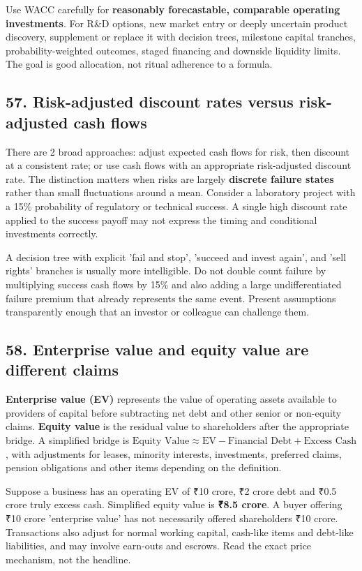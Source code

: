Use WACC carefully for \textbf{reasonably forecastable, comparable operating investments}. For R\&D options, new market entry or deeply uncertain product discovery, supplement or replace it with decision trees, milestone capital tranches, probability-weighted outcomes, staged financing and downside liquidity limits. The goal is good allocation, not ritual adherence to a formula.

\subsection{57. Risk-adjusted discount rates versus risk-adjusted cash flows}


There are 2 broad approaches: adjust expected cash flows for risk, then discount at a consistent rate; or use cash flows with an appropriate risk-adjusted discount rate. The distinction matters when risks are largely \textbf{discrete failure states} rather than small fluctuations around a mean. Consider a laboratory project with a 15\% probability of regulatory or technical success. A single high discount rate applied to the success payoff may not express the timing and conditional investments correctly.

A decision tree with explicit 'fail and stop', 'succeed and invest again', and 'sell rights' branches is usually more intelligible. Do not double count failure by multiplying success cash flows by 15\% and also adding a large undifferentiated failure premium that already represents the same event. Present assumptions transparently enough that an investor or colleague can challenge them.

\subsection{58. Enterprise value and equity value are different claims}


\textbf{Enterprise value (EV)} represents the value of operating assets available to providers of capital before subtracting net debt and other senior or non-equity claims. \textbf{Equity value} is the residual value to shareholders after the appropriate bridge. A simplified bridge is $\text{Equity Value} \approx \mathrm{EV} - \text{Financial Debt} + \text{Excess Cash}$, with adjustments for leases, minority interests, investments, preferred claims, pension obligations and other items depending on the definition.

Suppose a business has an operating EV of ₹10 crore, ₹2 crore debt and ₹0.5 crore truly excess cash. Simplified equity value is \textbf{₹8.5 crore}. A buyer offering ₹10 crore 'enterprise value' has not necessarily offered shareholders ₹10 crore. Transactions also adjust for normal working capital, cash-like items and debt-like liabilities, and may involve earn-outs and escrows. Read the exact price mechanism, not the headline.

